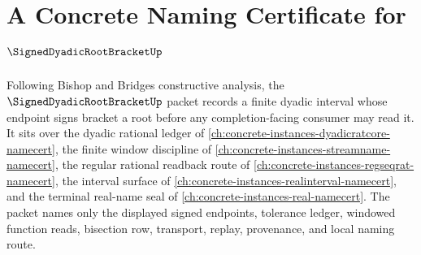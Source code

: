 \chapter{A Concrete Naming Certificate for $\SignedDyadicRootBracketUp$}
\label{ch:concrete-instances-signed-dyadic-root-bracket-namecert}

Following Bishop and Bridges constructive analysis, the $\SignedDyadicRootBracketUp$ packet records a finite dyadic interval whose endpoint signs bracket a root before any completion-facing consumer may read it. It sits over the dyadic rational ledger of \autoref{ch:concrete-instances-dyadicratcore-namecert}, the finite window discipline of \autoref{ch:concrete-instances-streamname-namecert}, the regular rational readback route of \autoref{ch:concrete-instances-regseqrat-namecert}, the interval surface of \autoref{ch:concrete-instances-realinterval-namecert}, and the terminal real-name seal of \autoref{ch:concrete-instances-real-namecert}. The packet names only the displayed signed endpoints, tolerance ledger, windowed function reads, bisection row, transport, replay, provenance, and local naming route.

